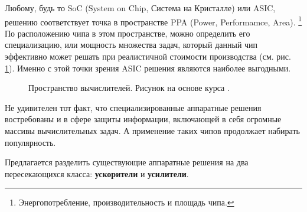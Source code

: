 \documentclass[a4paper,12pt]{article}
\begin{document}
Любому, будь то SoC (System on Chip, Система на Кристалле) или ASIC, решению соответствует точка в пространстве PPA (Power, Performamce, Area). \footnote{Энергопотребление, производительность и площадь чипа.} По расположению чипа в этом пространстве, можно определить его специализацию, или мощность множества задач, который данный чип эффективно может решать при реалистичной стоимости производства (см. рис. \ref{fig:asic-space}). Именно с этой точки зрения ASIC решения являются наиболее выгодными.

\begin{figure}[h]
	\centering
	
	\caption{Пространство вычислителей. Рисунок на основе курса \cite{DigitalASICDesign}.}
	\label{fig:asic-space}
\end{figure}

Не удивителен тот факт, что специализированные аппаратные решения востребованы и в сфере защиты информации, включающей в себя огромные массивы вычислительных задач. А применение таких чипов продолжает набирать популярность. 

Предлагается разделить существующие аппаратные решения на два пересекающихся класса: \textbf{ускорители} и \textbf{усилители}.
\end{document}
